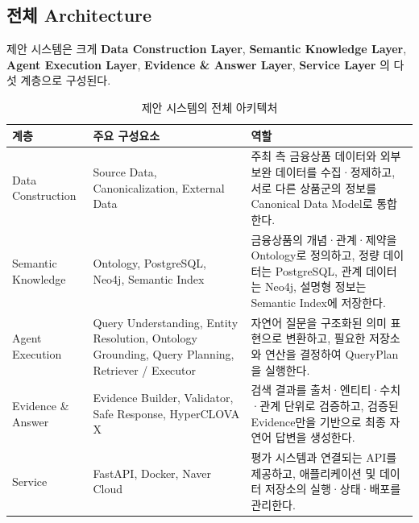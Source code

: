 \documentclass[11pt,a4paper]{article}
\begin{document}
\subsection{전체 Architecture}

제안 시스템은 크게
\textbf{Data Construction Layer},
\textbf{Semantic Knowledge Layer},
\textbf{Agent Execution Layer},
\textbf{Evidence \& Answer Layer},
\textbf{Service Layer}
의 다섯 계층으로 구성된다.

\begin{table}[htbp]
\centering
\caption{제안 시스템의 전체 아키텍처}
\small
\begin{tabularx}{\textwidth}{
>{\raggedright\arraybackslash}p{}
>{\raggedright\arraybackslash}p{}
>{\raggedright\arraybackslash}X}
\toprule
\textbf{계층} & \textbf{주요 구성요소} & \textbf{역할} \\
\midrule

Data Construction &
Source Data,
Canonicalization,
External Data &
주최 측 금융상품 데이터와 외부 보완 데이터를 수집·정제하고,
서로 다른 상품군의 정보를 Canonical Data Model로 통합한다. \\

\midrule

Semantic Knowledge &
Ontology,
PostgreSQL,
Neo4j,
Semantic Index &
금융상품의 개념·관계·제약을 Ontology로 정의하고,
정량 데이터는 PostgreSQL,
관계 데이터는 Neo4j,
설명형 정보는 Semantic Index에 저장한다. \\

\midrule

Agent Execution &
Query Understanding,
Entity Resolution,
Ontology Grounding,
Query Planning,
Retriever / Executor &
자연어 질문을 구조화된 의미 표현으로 변환하고,
필요한 저장소와 연산을 결정하여 QueryPlan을 실행한다. \\

\midrule

Evidence \& Answer &
Evidence Builder,
Validator,
Safe Response,
HyperCLOVA X &
검색 결과를 출처·엔티티·수치·관계 단위로 검증하고,
검증된 Evidence만을 기반으로 최종 자연어 답변을 생성한다. \\

\midrule

Service &
FastAPI,
Docker,
Naver Cloud &
평가 시스템과 연결되는 API를 제공하고,
애플리케이션 및 데이터 저장소의 실행·상태·배포를 관리한다. \\

\bottomrule
\end{tabularx}
\end{table}
\end{document}
